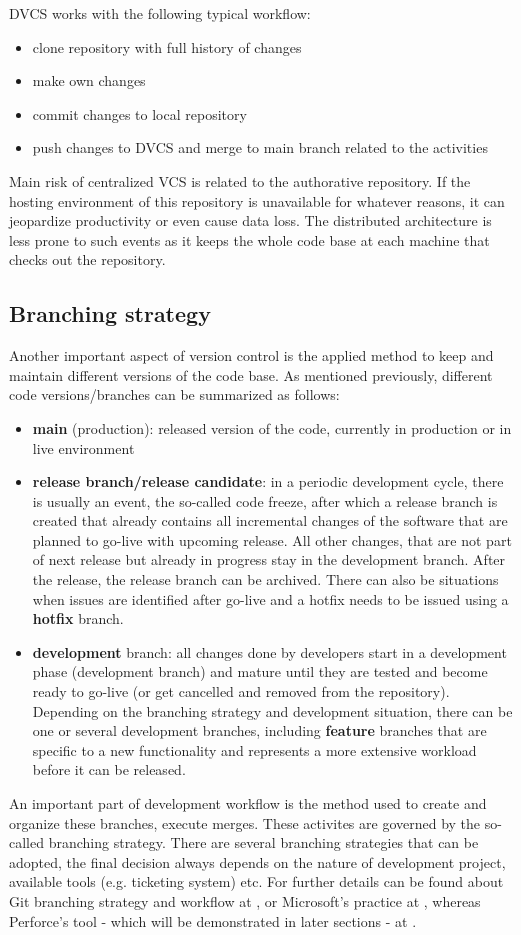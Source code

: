 DVCS works with the following typical workflow:
\begin{itemize}
    \item clone repository with full history of changes
    \item make own changes
    \item commit changes to local repository
    \item push changes to DVCS and merge to main branch related to the activities
\end{itemize}
Main risk of centralized VCS is related to the authorative repository. If the hosting environment of this repository is
unavailable for whatever reasons, it can jeopardize productivity or even cause data loss. The distributed architecture
is less prone to such events as it keeps the whole code base at each machine that checks out the repository.
\subsection{Branching strategy}
Another important aspect of version control is the applied method to keep and maintain different versions of the code base.
As mentioned previously, different code versions/branches can be summarized as follows:
\begin{itemize}
    \item \textbf{main} (production): released version of the code, currently in production or in live environment
    \item \textbf{release branch/release candidate}: in a periodic development cycle, there is usually an event, the so-called 
    code freeze, after which a release branch is created that already contains all incremental changes of the software 
    that are planned to go-live with upcoming release. All other changes, that are not part of next release but already
    in progress stay in the development branch. After the release, the release branch can be archived. There can also
    be situations when issues are identified after go-live and a hotfix needs to be issued using a \textbf{hotfix} branch.
    \item \textbf{development} branch: all changes done by developers start in a development phase (development branch) 
    and mature until they are tested and become ready to go-live (or get cancelled and removed from the repository).
    Depending on the branching strategy and development situation, there can be one or several development branches,
    including \textbf{feature} branches that are specific to a new functionality and represents a more extensive workload before
    it can be released.
\end{itemize}
An important part of development workflow is the method used to create and organize these branches, execute merges. These
activites are governed by the so-called branching strategy. There are several branching strategies that can be adopted,
the final decision always depends on the nature of development project, available tools (e.g. ticketing system) etc.
For further details can be found about Git branching strategy and workflow at \cite{gitflow-workflow}, or Microsoft's
practice at \cite{ms-tfs-branching}, whereas Perforce's tool - which will be demonstrated in later sections - at 
\cite{perforce-branching}. %
